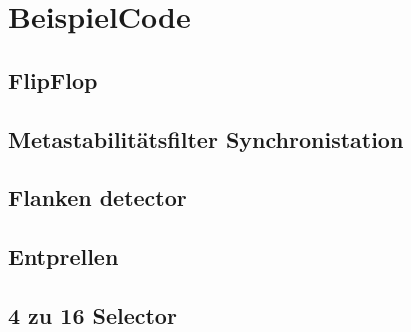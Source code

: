 \section{BeispielCode}
\subsection{FlipFlop}

\subsection{Metastabilitätsfilter Synchronistation}

\subsection{Flanken detector}

\subsection{Entprellen}

\subsection{4 zu 16 Selector}


